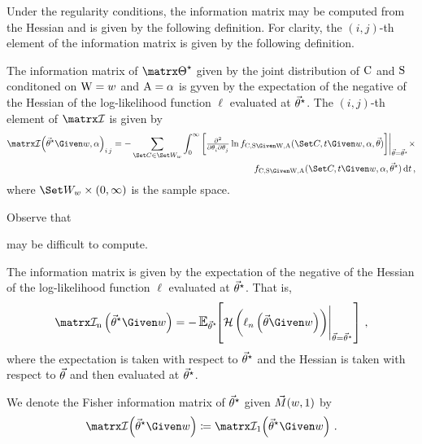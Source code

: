 \documentclass[../main.tex]{subfiles}
\begin{document}
Under the regularity conditions, the information matrix may be computed from the Hessian and is given by the following definition.
For clarity, the $(i,j)$-th element of the information matrix is given by the following definition.
\begin{definition}
The information matrix of $\tparam\sysparam$ given by the joint distribution of $\mathrm{C}$ and $\mathrm{S}$ conditoned on $\mathrm{W} = w$ and $\mathrm{A} = \alpha$ is gyven by the expectation of the negative of the Hessian of the log-likelihood function $\ell$ evaluated at ${\vec{\theta}}^{\star}$.
The $(i,j)$-th element of $\infomatrx$ is given by
\begin{equation}
\begin{split}
\label{eq:info_matrix_el}
\infomatrx\!\left(\tparam\sysparamvec \Given w, \alpha\right)_{i\,j}
= -\sum_{\cand \in \candsw{w}} \int_{0}^{\infty}
{
	\biggl[
	\md{}{2}{\paramv_i}{}{\paramv_j}{}
	\ln \pdf_{\rvcand,\sv \Given \RV{W},\RV{A}}(\cand, t \Given w, \alpha, \sysparamvec)
	\biggr]
}
\bigg \rvert_{\sysparamvec=\tparam\sysparamvec} \times\\
\qquad \pdf_{\rvcand,\sv \Given \RV{W},\RV{A}}(\cand, t \Given w, \alpha, \tparam\sysparamvec) \dif t\,,
\end{split}
\end{equation}
where $\candsw{w} \times (0,\infty)$ is the sample space.
\end{definition}

Observe that 

 may be difficult to compute.

\begin{definition}
The information matrix is given by the expectation of the negative of the Hessian of the log-likelihood function $\ell$ evaluated at ${\vec{\theta}}^{\star}$. That is,
\begin{equation}
\label{eq:info_matrix}
    \infomatrxn\left(\tparam\sysparamvec\Given w\right) = -\operatorname{\mathlarger{\expectation}_{\tparam\sysparamvec}}\!\!
    \left[
        \eval
        {
            \hessian \left(
                \ell_n\left(\sysparamvec \Given w \right)
            \right)
        }_{\sysparamvec=\tparam\sysparamvec} 
    \right ]\,,
\end{equation}
where the expectation is taken with respect to ${\vec{\theta}}^{\star}$ and the Hessian is taken with respect to $\vec{\theta}$ and then evaluated at ${\vec{\theta}}^{\star}$.
\end{definition}

\begin{notation}
We denote the Fisher information matrix of ${\vec{\theta}}^{\star}$ given $\vec{M}(w,{1})$ by
\begin{equation}
   \infomatrx\!\left(\tparam\sysparamvec \Given w\right) \coloneqq \infomatrxni{1}\!\left(\tparam\sysparamvec \Given w\right)\,.
\end{equation}
\end{notation}
\end{document}
